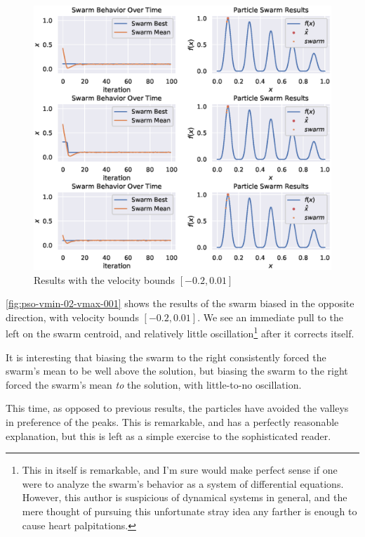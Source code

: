 \documentclass[12pt]{article}
\begin{document}
\begin{figure}[H]
    \centering
    \includegraphics[width=\textwidth]{figures/pso/pso-v20-v001.eps}
    \caption{Results with the velocity bounds $[-0.2, 0.01]$}\label{fig:pso-vmin-02-vmax-001}
\end{figure}

\autoref{fig:pso-vmin-02-vmax-001} shows the results of the swarm biased in the opposite direction, with velocity bounds $[-0.2, 0.01]$.
We see an immediate pull to the left on the swarm centroid, and relatively little oscillation\footnote{This in itself is remarkable, and I'm sure would make perfect sense if one were to analyze the swarm's behavior as a system of differential equations. However, this author is suspicious of dynamical systems in general, and the mere thought of pursuing this unfortunate stray idea any farther is enough to cause heart palpitations.} after it corrects itself.

It is interesting that biasing the swarm to the right consistently forced the swarm's mean to be well above the solution, but biasing the swarm to the right forced the swarm's mean \textit{to} the solution, with little-to-no oscillation.

This time, as opposed to previous results, the particles have avoided the valleys in preference of the peaks.
This is remarkable, and has a perfectly reasonable explanation, but this is left as a simple exercise to the sophisticated reader.
\end{document}
